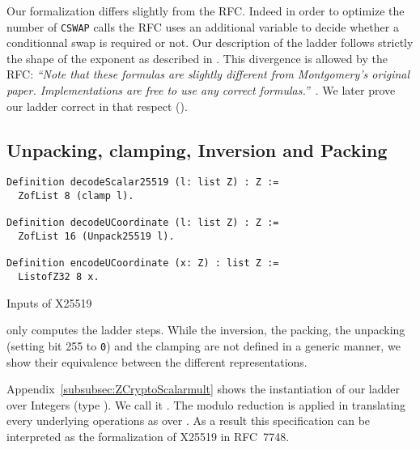 Our formalization differs slightly from the RFC. Indeed in order to optimize the
number of \texttt{CSWAP} calls the RFC uses an additional variable to decide
whether a conditionnal swap is required or not. Our description of the ladder
follows strictly the shape of the exponent as described in .
This divergence is allowed by the RFC:
\emph{``Note that these formulas are slightly different from Montgomery's
original paper.  Implementations are free to use any correct formulas.''}~\cite{rfc7748}.
We later prove our ladder correct in that respect ().




\subsection{Unpacking, clamping, Inversion and Packing}
\label{subsec:spec-unpack-clamp-inv-pack}


\begin{lstlisting}[language=Coq]
Definition decodeScalar25519 (l: list Z) : Z :=
  ZofList 8 (clamp l).

Definition decodeUCoordinate (l: list Z) : Z :=
  ZofList 16 (Unpack25519 l).

Definition encodeUCoordinate (x: Z) : list Z :=
  ListofZ32 8 x.
\end{lstlisting}

Inputs of X25519


 only computes the ladder steps.
While the inversion, the packing, the unpacking (setting bit 255 to \texttt{0})
and the clamping are not defined in a generic manner, we show their equivalence
between the different representations.

Appendix~\ref{subsubsec:ZCryptoScalarmult} shows the instantiation of our ladder
over Integers (type ). We call it .
The modulo reduction is applied in  translating every
underlying operations as over \Zfield. As a result this specification can be
interpreted as the formalization of X25519 in RFC~7748.
